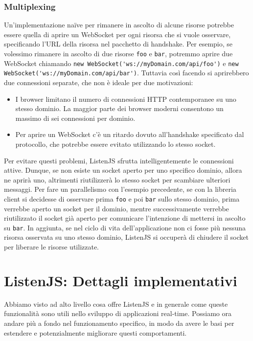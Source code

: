 \documentclass[12pt,a4paper,openright,twoside]{report}
\begin{document}
\subsection{Multiplexing}
Un'implementazione naïve per rimanere in ascolto di alcune risorse potrebbe essere quella di aprire un WebSocket per ogni risorsa che si vuole osservare, specificando l'URL della risorsa nel pacchetto di handshake. Per esempio, se volessimo rimanere in ascolto di due risorse \lstinline{foo} e \lstinline{bar}, potremmo aprire due WebSocket chiamando \lstinline{new WebSocket('ws://myDomain.com/api/foo')} e \lstinline{new WebSocket('ws://myDomain.com/api/bar')}. Tuttavia così facendo si aprirebbero due connessioni separate, che non è ideale per due motivazioni:
\begin{itemize}
\item I browser limitano il numero di connessioni HTTP contemporanee su uno stesso dominio\cite{http11_rfc}. La maggior parte dei browser moderni consentono un massimo di sei connessioni per dominio.
\item Per aprire un WebSocket c'è un ritardo dovuto all'handshake specificato dal protocollo, che potrebbe essere evitato utilizzando lo stesso socket.
\end{itemize}

\bigskip

Per evitare questi problemi, ListenJS sfrutta intelligentemente le connessioni attive. Dunque, se non esiste un socket aperto per uno specifico dominio, allora ne aprirà uno, altrimenti riutilizzerà lo stesso socket per scambiare ulteriori messaggi. Per fare un parallelismo con l'esempio precedente, se con la libreria client si decidesse di osservare prima \lstinline{foo} e poi \lstinline{bar} sullo stesso dominio, prima verrebbe aperto un socket per il dominio, mentre successivamente verrebbe riutilizzato il socket già aperto per comunicare l'intenzione di mettersi in ascolto su \lstinline{bar}.
In aggiunta, se nel ciclo di vita dell'applicazione non ci fosse più nessuna risorsa osservata su uno stesso dominio, ListenJS si occuperà di chiudere il socket per liberare le risorse utilizzate.

\chapter{ListenJS: Dettagli implementativi}
Abbiamo visto ad alto livello cosa offre ListenJS e in generale come queste funzionalità sono utili nello sviluppo di applicazioni real-time. Possiamo ora andare più a fondo nel funzionamento specifico, in modo da avere le basi per estendere e potenzialmente migliorare questi comportamenti.
\end{document}
